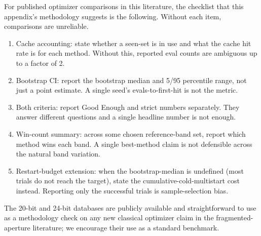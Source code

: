 For published optimizer comparisons in this literature, the
checklist that this appendix's methodology suggests is the
following. Without each item, comparisons are unreliable.
\begin{enumerate}
\item Cache accounting: state whether a seen-set is in use and what
      the cache hit rate is for each method. Without this, reported
      eval counts are ambiguous up to a factor of 2.
\item Bootstrap CI: report the bootstrap median and 5/95 percentile
      range, not just a point estimate. A single seed's
      evals-to-first-hit is not the metric.
\item Both criteria: report Good Enough and strict numbers
      separately. They answer different questions and a single
      headline number is not enough.
\item Win-count summary: across some chosen reference-band set,
      report which method wins each band. A single best-method
      claim is not defensible across the natural band variation.
\item Restart-budget extension: when the bootstrap-median is
      undefined (most trials do not reach the target), state the
      cumulative-cold-multistart cost instead. Reporting only the
      successful trials is sample-selection bias.
\end{enumerate}

The 20-bit and 24-bit databases are publicly available and
straightforward to use as a methodology check on any new classical
optimizer claim in the fragmented-aperture literature; we encourage
their use as a standard benchmark.

